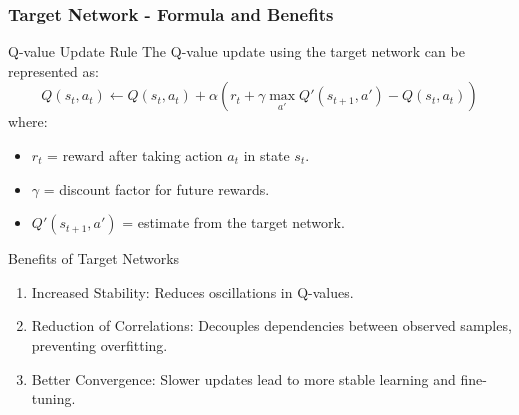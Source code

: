 \documentclass[aspectratio=169]{beamer}
\begin{document}
\begin{frame}[fragile]
    \frametitle{Target Network - Formula and Benefits}
    \begin{block}{Q-value Update Rule}
        The Q-value update using the target network can be represented as:
        \begin{equation}
            Q(s_t, a_t) \leftarrow Q(s_t, a_t) + \alpha \left( r_t + \gamma \max_{a'} Q'(s_{t+1}, a') - Q(s_t, a_t) \right)
        \end{equation}
        where:
        \begin{itemize}
            \item $r_t$ = reward after taking action $a_t$ in state $s_t$.
            \item $\gamma$ = discount factor for future rewards.
            \item $Q'(s_{t+1}, a')$ = estimate from the target network.
        \end{itemize}
    \end{block}

    \begin{block}{Benefits of Target Networks}
        \begin{enumerate}
            \item Increased Stability: Reduces oscillations in Q-values.
            \item Reduction of Correlations: Decouples dependencies between observed samples, preventing overfitting.
            \item Better Convergence: Slower updates lead to more stable learning and fine-tuning.
        \end{enumerate}
    \end{block}
\end{frame}
\end{document}
